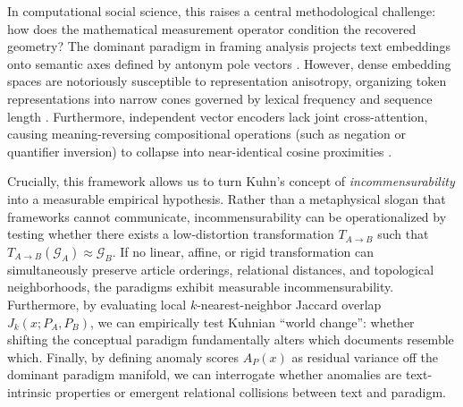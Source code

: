 In computational social science, this raises a central methodological challenge: how does the mathematical measurement operator condition the recovered geometry? The dominant paradigm in framing analysis projects text embeddings onto semantic axes defined by antonym pole vectors \citep{kwak2021frameaxis}. However, dense embedding spaces are notoriously susceptible to representation anisotropy, organizing token representations into narrow cones governed by lexical frequency and sequence length \citep{gabaix1999,mu2018allbutthetop}. Furthermore, independent vector encoders lack joint cross-attention, causing meaning-reversing compositional operations (such as negation or quantifier inversion) to collapse into near-identical cosine proximities \citep{ettinger2020}.

Crucially, this framework allows us to turn Kuhn's concept of \emph{incommensurability} into a measurable empirical hypothesis. Rather than a metaphysical slogan that frameworks cannot communicate, incommensurability can be operationalized by testing whether there exists a low-distortion transformation $T_{A \to B}$ such that $T_{A \to B}(\mathcal{G}_A) \approx \mathcal{G}_B$. If no linear, affine, or rigid transformation can simultaneously preserve article orderings, relational distances, and topological neighborhoods, the paradigms exhibit measurable incommensurability. Furthermore, by evaluating local $k$-nearest-neighbor Jaccard overlap $J_k(x; P_A, P_B)$, we can empirically test Kuhnian ``world change'': whether shifting the conceptual paradigm fundamentally alters which documents resemble which. Finally, by defining anomaly scores $A_P(x)$ as residual variance off the dominant paradigm manifold, we can interrogate whether anomalies are text-intrinsic properties or emergent relational collisions between text and paradigm.

